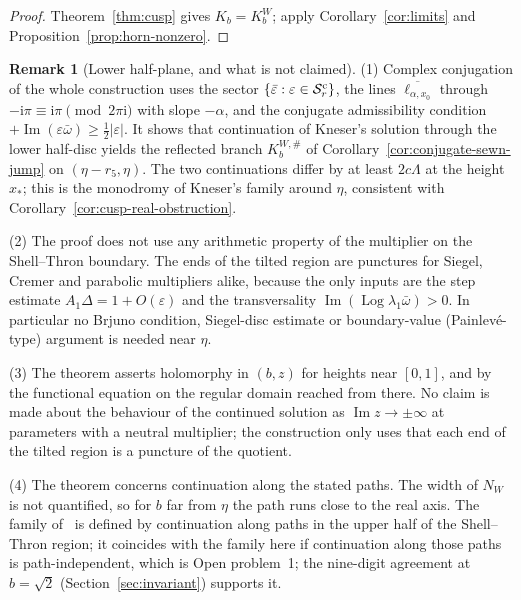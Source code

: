 \documentclass[11pt]{amsart}
\theoremstyle{definition}
\newtheorem{remark}[theorem]{Remark}
\newcommand{\Kk}{K}
\newcommand{\ii}{\mathrm{i}}
\begin{document}
\begin{proof}
Theorem~\ref{thm:cusp} gives $\Kk_b=\Kk^W_b$; apply Corollary~\ref{cor:limits}
and Proposition~\ref{prop:horn-nonzero}.
\end{proof}

\begin{remark}[Lower half-plane, and what is not claimed]\label{rem:cusp}
(1) Complex conjugation of the whole construction uses the sector
$\{\bar\varepsilon:\varepsilon\in\mathcal S^{\rm c}_r\}$, the lines $\overline{\ell_{\alpha,x_0}}$ through
$-\ii\pi\equiv\ii\pi\pmod{2\pi\ii}$ with slope $-\alpha$, and the conjugate admissibility
condition $+\operatorname{Im}(\varepsilon\bar\omega)\ge\tfrac12|\varepsilon|$.  It shows that continuation of
Kneser's solution through the lower half-disc yields the reflected branch
$\Kk^{W,\#}_b$ of Corollary~\ref{cor:conjugate-sewn-jump} on $(\eta-r_5,\eta)$.  The two
continuations differ by at least $2c\Lambda$ at the height $x_*$; this is the
monodromy of Kneser's family around $\eta$, consistent with
Corollary~\ref{cor:cusp-real-obstruction}.

(2) The proof does not use any arithmetic property of the multiplier on the
Shell--Thron boundary.  The ends of the tilted region are punctures for
Siegel, Cremer and parabolic multipliers alike, because the only inputs are
the step estimate $A_1\Delta=1+O(\varepsilon)$ and the transversality
$\operatorname{Im}(\operatorname{Log}\lambda_1\bar\omega)>0$.  In particular no
Brjuno condition, Siegel-disc estimate or boundary-value (Painlev\'e-type)
argument is needed near $\eta$.

(3) The theorem asserts holomorphy in $(b,z)$ for heights near $[0,1]$, and
by the functional equation on the regular domain reached from there.  No
claim is made about the behaviour of the continued solution as
$\operatorname{Im}z\to\pm\infty$ at parameters with a neutral multiplier; the
construction only uses that each end of the tilted region is a puncture of
the quotient.

(4) The theorem concerns continuation along the stated paths.  The width of
$N_W$ is not quantified, so for $b$ far from $\eta$ the path runs close to the
real axis.  The family of~\cite{Paulsen2019} is defined by continuation along
paths in the upper half of the Shell--Thron region; it coincides with the
family here if continuation along those paths is path-independent, which is
Open problem~1; the nine-digit agreement at $b=\sqrt2$
(Section~\ref{sec:invariant}) supports it.
\end{remark}
\end{document}
